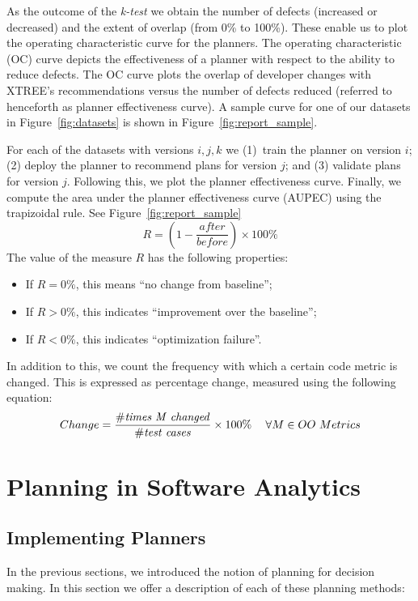 \documentclass[10pt,journal,compsoc]{IEEEtran}
\newcommand{\bi}{\begin{itemize}} %
\newcommand{\ei}{\end{itemize}}
\newcommand{\fig}[1]{Figure~\ref{fig:#1}}
\begin{document}


As the outcome of the \textit{k-test} we obtain the number of defects (increased or decreased) and the extent of overlap (from 0\% to 100\%). These enable us to plot the operating characteristic curve for the planners. The operating characteristic (OC) curve depicts the effectiveness of a planner with respect to the ability to reduce defects. The OC curve plots the overlap of developer changes with XTREE's recommendations versus the number of  defects reduced (referred to henceforth as planner effectiveness curve). A sample curve for one of our datasets in \fig{datasets} is shown in \fig{report_sample}.

For each of the datasets with versions $i, j, k$ we (1)~train the planner on version $i$; (2) deploy the planner to recommend plans for version $j$; and (3) validate plans for version $j$. Following this, we plot the planner effectiveness curve. Finally, we compute the area under the planner effectiveness curve (AUPEC) using the trapizoidal rule. See \fig{report_sample}
\begin{equation}
	\label{eq:diff}
	R=(1-\frac{\mathit{after}}{\mathit{before}})\times100\%
\end{equation}
The value of the measure $R$ has the following properties:
\bi
\item If $R = 0\%$, this means  ``no change from baseline''; 
\item If $R > 0\%$, this indicates ``improvement over the baseline'';
\item If $R < 0\%$, this indicates ``optimization failure''.
\ei


In addition to this, we count the frequency with which a certain code metric is changed. This is expressed as percentage change, measured using the following equation:
\begin{equation}
	\label{eq:change}
	\small
	Change=\frac{\mathit{\#times\ M\ changed}}{\mathit{\#test\ cases}}\times100\%~~~~\forall M \in OO\ Metrics
\end{equation}

\section{Planning in Software Analytics}
\label{sect:motivate}
\subsection{Implementing Planners}
\label{sect:planners}
In the previous sections, we introduced the notion of planning for decision making. In this section we offer a description of each of these planning methods:
\end{document}
